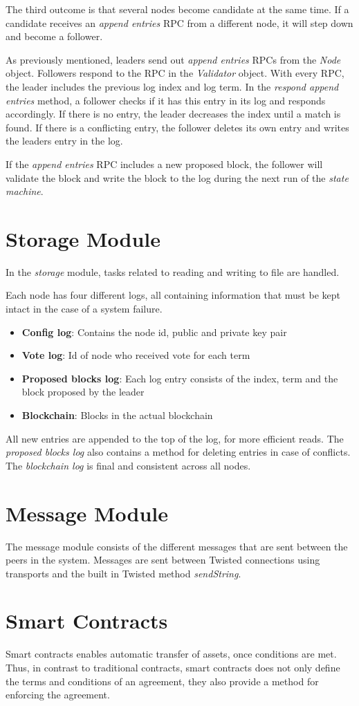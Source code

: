 The third outcome is that several nodes become candidate at the same time. If a candidate receives an \textit{append entries} RPC from a different node, it will step down and become a follower. 

As previously mentioned, leaders send out \textit{append entries} RPCs from the \textit{Node} object. Followers respond to the RPC in the \textit{Validator} object. With every RPC, the leader includes the previous log index and log term. In the \textit{respond append entries} method, a follower checks if it has this entry in its log and responds accordingly. If there is no entry, the leader decreases the index until a match is found. If there is a conflicting entry, the follower deletes its own entry and writes the leaders entry in the log. 

If the \textit{append entries} RPC includes a new proposed block, the follower will validate the block and write the block to the log during the next run of the \textit{state machine}. 


\section{Storage Module}
In the \textit{storage} module, tasks related to reading and writing to file are handled. 

Each node has four different logs, all containing information that must be kept intact in the case of a system failure. 

\begin{itemize}
\item\textbf{Config log}: Contains the node id, public and private key pair
\item\textbf{Vote log}: Id of node who received vote for each term
\item\textbf{Proposed blocks log}: Each log entry consists of the index, term and the block proposed by the leader
\item\textbf{Blockchain}: Blocks in the actual blockchain
\end{itemize}

All new entries are appended to the top of the log, for more efficient reads. The \textit{proposed blocks log} also contains a method for deleting entries in case of conflicts. The \textit{blockchain log} is final and consistent across all nodes.

\section{Message Module}
The message module consists of the different messages that are sent between the peers in the system. Messages are sent between Twisted connections using transports and the built in Twisted method \textit{sendString}. 


\section{Smart Contracts}
Smart contracts enables automatic transfer of assets, once conditions are met. Thus, in contrast to traditional contracts, smart contracts does not only define the terms and conditions of an agreement, they also provide a method for enforcing the agreement.
